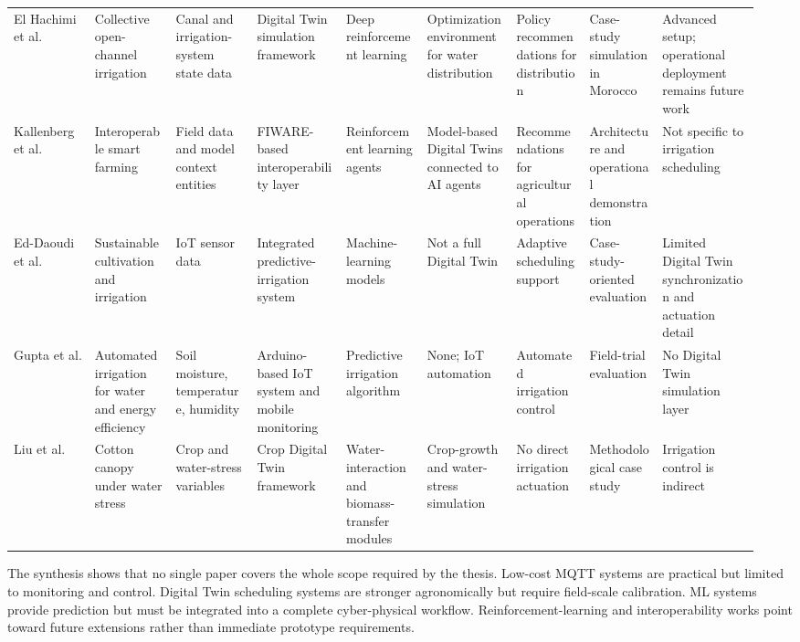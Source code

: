 \begin{landscape}
\begin{scriptsize}
\begin{longtable}{@{}p{0.10\linewidth}p{0.105\linewidth}p{0.105\linewidth}p{0.115\linewidth}p{0.10\linewidth}p{0.115\linewidth}p{0.095\linewidth}p{0.095\linewidth}p{0.12\linewidth}@{}}
El Hachimi et al. \cite{elhachimi2025collectiveirrigationdt} & Collective open-channel irrigation & Canal and irrigation-system state data & Digital Twin simulation framework & Deep reinforcement learning & Optimization environment for water distribution & Policy recommendations for distribution & Case-study simulation in Morocco & Advanced setup; operational deployment remains future work \\
Kallenberg et al. \cite{kallenberg2025interoperabledt} & Interoperable smart farming & Field data and model context entities & FIWARE-based interoperability layer & Reinforcement learning agents & Model-based Digital Twins connected to AI agents & Recommendations for agricultural operations & Architecture and operational demonstration & Not specific to irrigation scheduling \\
Ed-Daoudi et al. \cite{eddaoudi2024predictiveirrigation} & Sustainable cultivation and irrigation & IoT sensor data & Integrated predictive-irrigation system & Machine-learning models & Not a full Digital Twin & Adaptive scheduling support & Case-study-oriented evaluation & Limited Digital Twin synchronization and actuation detail \\
Gupta et al. \cite{gupta2025iotirrigation} & Automated irrigation for water and energy efficiency & Soil moisture, temperature, humidity & Arduino-based IoT system and mobile monitoring & Predictive irrigation algorithm & None; IoT automation & Automated irrigation control & Field-trial evaluation & No Digital Twin simulation layer \\
Liu et al. \cite{liu2025cottondt} & Cotton canopy under water stress & Crop and water-stress variables & Crop Digital Twin framework & Water-interaction and biomass-transfer modules & Crop-growth and water-stress simulation & No direct irrigation actuation & Methodological case study & Irrigation control is indirect \\
\bottomrule
\end{longtable}
\end{scriptsize}
\end{landscape}

The synthesis shows that no single paper covers the whole scope required by the thesis. Low-cost MQTT systems are practical but limited to monitoring and control. Digital Twin scheduling systems are stronger agronomically but require field-scale calibration. ML systems provide prediction but must be integrated into a complete cyber-physical workflow. Reinforcement-learning and interoperability works point toward future extensions rather than immediate prototype requirements.


